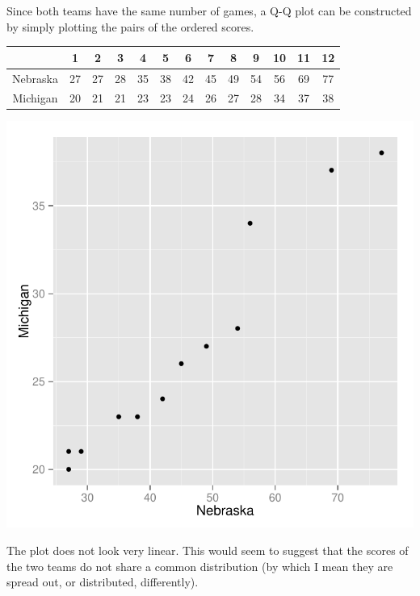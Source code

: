 \documentclass[11pt]{article}\usepackage[]{graphicx}\usepackage[]{color}
\makeatletter
\def\maxwidth{ %
  \ifdim\Gin@nat@width>\linewidth
    \linewidth
  \else
    \Gin@nat@width
  \fi
}
\newenvironment{knitrout}{}{} %
\makeatother
\begin{document}
   Since both teams have the same number of games, a Q-Q plot can be constructed by simply plotting the pairs of the ordered scores. \\

\begin{center}
\begin{tabular}{ccccccccccccc}\hline
    & 1 & 2 & 3 & 4 & 5 & 6 & 7 & 8 & 9 & 10 & 11 & 12 \\ \hline
   Nebraska  &  27  & 27  & 28  & 35  & 38  & 42  & 45  & 49  & 54  & 56  & 69  & 77  \\
   Michigan  &  20  & 21  & 21  & 23  & 23  & 24  & 26  & 27  & 28  & 34  & 37  & 38  \\
\end{tabular}
\end{center}
\begin{knitrout}
\color{fgcolor}
\includegraphics[width=.5\maxwidth]{figure/unnamed-chunk-2-1} 

\end{knitrout}

The plot does not look very linear. This would seem to suggest that the scores of the two teams do not share a common distribution (by which I mean they are spread out, or distributed, differently).
\end{document}
